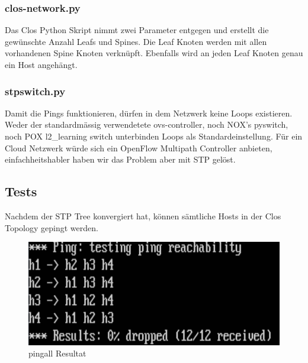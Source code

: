 \subsubsection{clos-network.py}
Das Clos Python Skript nimmt zwei Parameter entgegen und erstellt die gewünschte Anzahl Leafs und Spines. Die Leaf Knoten werden mit allen vorhandenen Spine Knoten verknüpft. Ebenfalls wird an jeden Leaf Knoten genau ein Host angehängt.


\subsubsection{stpswitch.py}
Damit die Pings funktionieren, dürfen in dem Netzwerk keine Loops existieren. Weder der standardmässig verwendetete ovs-controller, noch NOX's pyswitch, noch POX l2\_learning switch unterbinden Loops als Standardeinstellung. Für ein Cloud Netzwerk würde sich ein OpenFlow Multipath Controller anbieten, einfachheitshabler haben wir das Problem aber mit STP gelöst. 



\subsection{Tests}
Nachdem der STP Tree konvergiert hat, können sämtliche Hosts in der Clos Topology gepingt werden.
\begin{figure}[h]
\centering
\includegraphics[width=0.7\linewidth]{images/ping_result}
\caption{pingall Resultat}
\label{fig:pingresult}
\end{figure}





